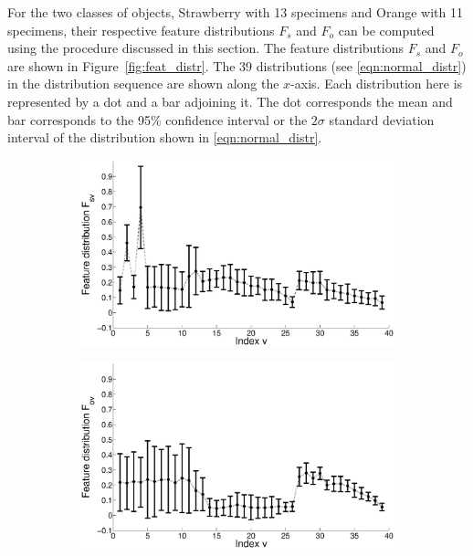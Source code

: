 \documentclass {udthesis}
\begin{document}
For the two classes of objects, Strawberry with 13 specimens and Orange with 11 specimens, their respective feature distributions $F_s$ and $F_o$ can be computed using the procedure discussed in this section. The feature distributions $F_s$ and $F_o$ are shown in Figure~\ref{fig:feat_distr}. The 39 distributions (see \eqref{eqn:normal_distr}) in the distribution sequence are shown along the $x$-axis. Each distribution here is represented by a dot and a bar adjoining it. The dot corresponds the mean and bar corresponds to the 95\% confidence interval or the $2\sigma$ standard deviation interval of the distribution shown in \eqref{eqn:normal_distr}.
%
\begin{figure}
  \centering
  \begin{subfigure}[]{0.8\textwidth}
      \includegraphics[width=\textwidth]{strawberry_learning_feature_distribution}
      \caption{}
      \label{fig:feat_distr_strawberry}
  \end{subfigure}
  \begin{subfigure}[]{0.8\textwidth}
      \includegraphics[width=\textwidth]{orange_learning_feature_distribution}

\end{subfigure}
\end{figure}
\end{document}
